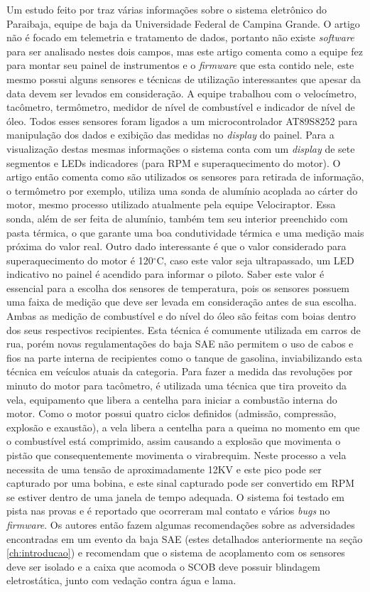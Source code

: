 Um estudo feito por  traz várias informações sobre o sistema eletrônico do Paraibaja, equipe de baja da Universidade Federal de Campina Grande. O artigo não é focado em telemetria e tratamento de dados, portanto não existe \textit{software} para ser analisado nestes dois campos, mas este artigo comenta como a equipe fez para montar seu painel de instrumentos e o \textit{firmware} que esta contido nele, este mesmo possui alguns sensores e técnicas de utilização interessantes que apesar da data devem ser levados em consideração. A equipe trabalhou com o velocímetro, tacômetro, termômetro, medidor de nível de combustível e indicador de nível de óleo. Todos esses sensores foram ligados a um microcontrolador AT89S8252 para manipulação dos dados e exibição das medidas no \textit{display} do painel. Para a visualização destas mesmas informações o sistema conta com um \textit{display} de sete segmentos e LEDs indicadores (para RPM e superaquecimento do motor). O artigo então comenta como são utilizados os sensores para retirada de informação, o termômetro por exemplo, utiliza uma sonda de alumínio acoplada ao cárter do motor, mesmo processo utilizado atualmente pela equipe Velociraptor. Essa sonda, além de ser feita de alumínio, também tem seu interior preenchido com pasta térmica, o que garante uma boa condutividade térmica e uma medição mais próxima do valor real. Outro dado interessante é que o valor considerado para superaquecimento do motor é 120$^\circ$C, caso este valor seja ultrapassado, um LED indicativo no painel é acendido para informar o piloto. Saber este valor é essencial para a escolha dos sensores de temperatura, pois os sensores possuem uma faixa de medição que deve ser levada em consideração antes de sua escolha. Ambas as medição de combustível e do nível do óleo são feitas com boias dentro dos seus respectivos recipientes. Esta técnica é comumente utilizada em carros de rua, porém novas regulamentações do baja SAE \cite{regulamentobajasae} não permitem o uso de cabos e fios na parte interna de recipientes como o tanque de gasolina, inviabilizando esta técnica em veículos atuais da categoria. Para fazer a medida das revoluções por minuto do motor para tacômetro, é utilizada uma técnica que tira proveito da vela, equipamento que libera a centelha para iniciar a combustão interna do motor. Como o motor possui quatro ciclos definidos (admissão, compressão, explosão e exaustão), a vela libera a centelha para a queima no momento em que o combustível está comprimido, assim causando a explosão que movimenta o pistão que consequentemente movimenta o virabrequim. Neste processo a vela necessita de uma tensão de aproximadamente 12KV e este pico pode ser capturado por uma bobina, e este sinal capturado pode ser convertido em RPM se estiver dentro de uma janela de tempo adequada. O sistema foi testado em pista nas provas e é reportado que ocorreram mal contato e vários \textit{bugs} no \textit{firmware}. Os autores então fazem algumas recomendações sobre as adversidades encontradas em um evento da baja SAE (estes detalhados anteriormente na seção \ref{ch:introducao}) e recomendam que o sistema de acoplamento com os sensores deve ser isolado e a caixa que acomoda o SCOB deve possuir blindagem eletrostática, junto com vedação contra água e lama.


